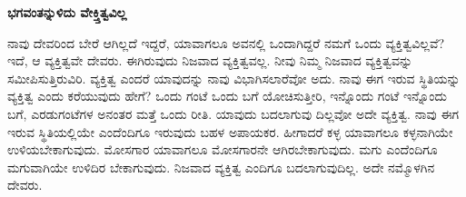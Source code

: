 \begin{center}
\textbf{ಭಗವಂತನ್ನುಳಿದು ವೇಕ್ತ್ತಿತ್ವವಿಲ್ಲ}
\end{center}

ನಾವು ದೇವರಿಂದ ಬೇರೆ ಆಗಿಲ್ಲದೆ ಇದ್ದರೆ, ಯಾವಾಗಲೂ ಅವನಲ್ಲಿ ಒಂದಾಗಿದ್ದರೆ ನಮಗೆ ಒಂದು ವ್ಯಕ್ತಿತ್ವವಿಲ್ಲವೆ? ಇದೆ, ಆ ವ್ಯಕ್ತಿತ್ವವೇ ದೇವರು. ಈಗಿರುವುದು ನಿಜವಾದ ವ್ಯಕ್ತಿತ್ವವಲ್ಲ. ನೀವು ನಿಮ್ಮ ನಿಜವಾದ ವ್ಯಕ್ತಿತ್ವವನ್ನು ಸಮೀಪಿಸುತ್ತಿರುವಿರಿ. ವ್ಯಕ್ತಿತ್ವ ಎಂದರೆ ಯಾವುದನ್ನು ನಾವು ವಿಭಾಗಿಸಲಾರೆವೋ ಅದು. ನಾವು ಈಗ ಇರುವ ಸ್ಥಿತಿಯನ್ನು ವ್ಯಕ್ತಿತ್ವ ಎಂದು ಕರೆಯುವುದು ಹೇಗೆ? ಒಂದು ಗಂಟೆ ಒಂದು ಬಗೆ ಯೋಚಿಸುತ್ತೀರಿ, ಇನ್ನೊಂದು ಗಂಟೆ ಇನ್ನೊಂದು ಬಗೆ, ಎರಡುಗಂಟೆಗಳ ಅನಂತರ ಮತ್ತೆ ಒಂದು ರೀತಿ. ಯಾವುದು ಬದಲಾಗುವು ದಿಲ್ಲವೋ ಅದೇ ವ್ಯಕ್ತಿತ್ವ. ನಾವು ಈಗ ಇರುವ ಸ್ಥಿತಿಯಲ್ಲಿಯೇ ಎಂದೆಂದಿಗೂ ಇರುವುದು ಬಹಳ ಅಪಾಯಕರ. ಹೀಗಾದರೆ ಕಳ್ಳ ಯಾವಾಗಲೂ ಕಳ್ಳನಾಗಿಯೇ ಉಳಿಯಬೇಕಾಗುವುದು. ಮೋಸಗಾರ ಯಾವಾಗಲೂ ಮೋಸಗಾರನೇ ಆಗಿರಬೇಕಾಗುವುದು. ಮಗು ಎಂದೆಂದಿಗೂ ಮಗುವಾಗಿಯೇ ಉಳಿದಿರ ಬೇಕಾಗುವುದು. ನಿಜವಾದ ವ್ಯಕ್ತಿತ್ವ ಎಂದಿಗೂ ಬದಲಾಗುವುದಿಲ್ಲ. ಅದೇ ನಮ್ಮೊಳಗಿನ ದೇವರು.

